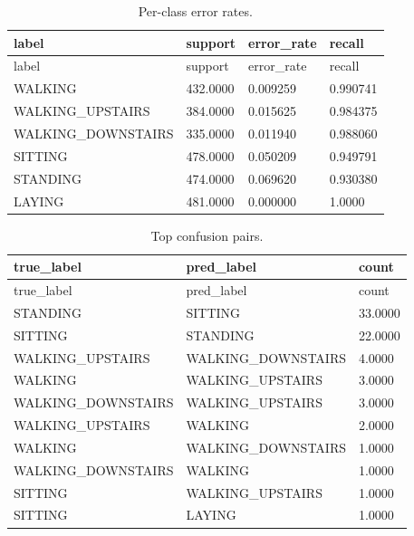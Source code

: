 \documentclass[11pt]{report}
\begin{document}
\begin{longtable}{llll}
\caption{Per-class error rates.}\\
\toprule
label & support & error\_rate & recall \\
\midrule
\endfirsthead
\toprule
label & support & error\_rate & recall \\
\midrule
\endhead
WALKING & 432.0000 & 0.009259 & 0.990741 \\
WALKING\_UPSTAIRS & 384.0000 & 0.015625 & 0.984375 \\
WALKING\_DOWNSTAIRS & 335.0000 & 0.011940 & 0.988060 \\
SITTING & 478.0000 & 0.050209 & 0.949791 \\
STANDING & 474.0000 & 0.069620 & 0.930380 \\
LAYING & 481.0000 & 0.000000 & 1.0000 \\
\bottomrule
\end{longtable}
\begin{longtable}{lll}
\caption{Top confusion pairs.}\\
\toprule
true\_label & pred\_label & count \\
\midrule
\endfirsthead
\toprule
true\_label & pred\_label & count \\
\midrule
\endhead
STANDING & SITTING & 33.0000 \\
SITTING & STANDING & 22.0000 \\
WALKING\_UPSTAIRS & WALKING\_DOWNSTAIRS & 4.0000 \\
WALKING & WALKING\_UPSTAIRS & 3.0000 \\
WALKING\_DOWNSTAIRS & WALKING\_UPSTAIRS & 3.0000 \\
WALKING\_UPSTAIRS & WALKING & 2.0000 \\
WALKING & WALKING\_DOWNSTAIRS & 1.0000 \\
WALKING\_DOWNSTAIRS & WALKING & 1.0000 \\
SITTING & WALKING\_UPSTAIRS & 1.0000 \\
SITTING & LAYING & 1.0000 \\
\bottomrule
\end{longtable}
\end{document}
